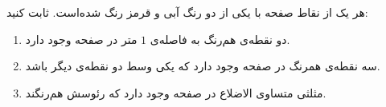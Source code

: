 \EXERCISE
هر یک از نقاط صفحه با یکی از دو رنگ آبی و قرمز رنگ شده‌است. ثابت کنید:
\begin{enumerate}
\item
دو نقطه‌ی هم‌رنگ به فاصله‌ی
$1$
متر در صفحه وجود دارد.
\item
سه نقطه‌ی همرنگ در صفحه وجود دارد که یکی وسط دو نقطه‌ی دیگر باشد.
\item
مثلثی متساوی الاضلاع در صفحه وجود دارد که رئوسش هم‌رنگند.
\end{enumerate}